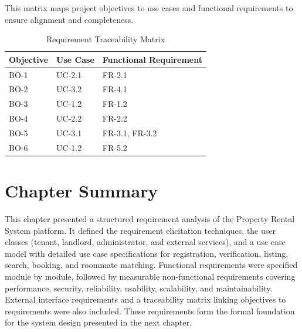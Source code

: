 This matrix maps project objectives to use cases and functional requirements to ensure alignment and completeness.

\begin{table}[h]
\centering
\caption{Requirement Traceability Matrix}

\begin{tabularx}{\textwidth}{|>{\raggedright\arraybackslash}p{2cm}|>{\raggedright\arraybackslash}p{3cm}|X|}
\hline
\textbf{Objective} & \textbf{Use Case} & \textbf{Functional Requirement} \\ \hline
BO-1 & UC-2.1 & FR-2.1 \\ \hline
BO-2 & UC-3.2 & FR-4.1 \\ \hline
BO-3 & UC-1.2 & FR-1.2 \\ \hline
BO-4 & UC-2.2 & FR-2.2 \\ \hline
BO-5 & UC-3.1 & FR-3.1, FR-3.2 \\ \hline
BO-6 & UC-1.2 & FR-5.2 \\ \hline
\end{tabularx}

\end{table}

\section*{Chapter Summary}

This chapter presented a structured requirement analysis of the Property Rental System platform.
It defined the requirement elicitation techniques, the user classes (tenant,
landlord, administrator, and external services), and a use case model with
detailed use case specifications for registration, verification, listing,
search, booking, and roommate matching. Functional requirements were specified
module by module, followed by measurable non-functional requirements covering
performance, security, reliability, usability, scalability, and maintainability.
External interface requirements and a traceability matrix linking objectives to
requirements were also included. These requirements form the formal foundation
for the system design presented in the next chapter.
